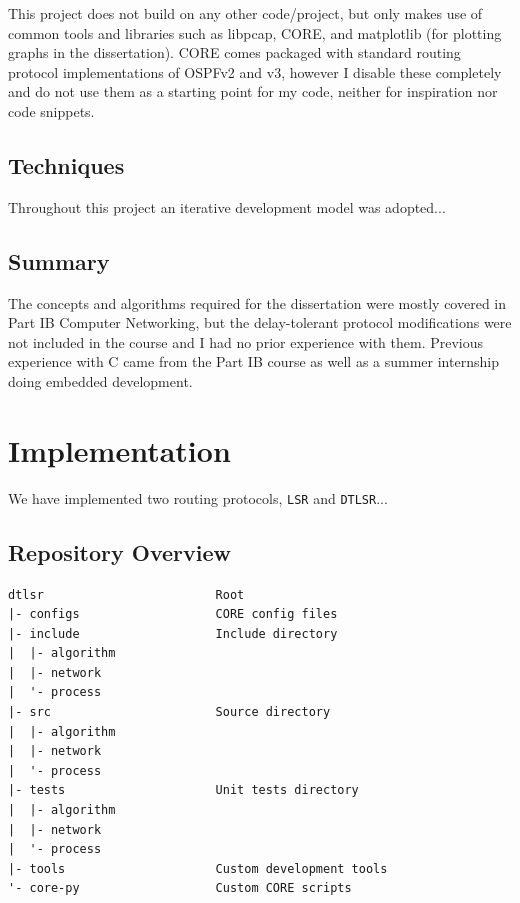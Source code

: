 \documentclass[withindex,glossary,openany]{cam-thesis}
\begin{document}
This project does not build on any other code/project, but only makes use of common tools and libraries such as libpcap, CORE, and matplotlib (for plotting graphs in the dissertation). CORE comes packaged with standard routing protocol implementations of OSPFv2 and v3, however I disable these completely and do not use them as a starting point for my code, neither for inspiration nor code snippets.

\section{Techniques}

Throughout this project an iterative development model was adopted...

\section{Summary}

The concepts and algorithms required for the dissertation were mostly covered in Part IB Computer Networking, but the delay-tolerant protocol modifications were not included in the course and I had no prior experience with them. Previous experience with C came from the Part IB course as well as a summer internship doing embedded development.

\chapter{Implementation}

We have implemented two routing protocols, \texttt{LSR} and \texttt{DTLSR}...

\section{Repository Overview}
\begin{minipage}{1\textwidth} \centering
\begin{lstlisting}[label=node_ex_listing, frame=tb, columns=fullflexible]
dtlsr                        Root
|- configs                   CORE config files
|- include                   Include directory
|  |- algorithm
|  |- network
|  '- process
|- src                       Source directory
|  |- algorithm
|  |- network
|  '- process
|- tests                     Unit tests directory
|  |- algorithm
|  |- network
|  '- process
|- tools                     Custom development tools
'- core-py                   Custom CORE scripts
\end{lstlisting}
\end{minipage}
\end{document}
